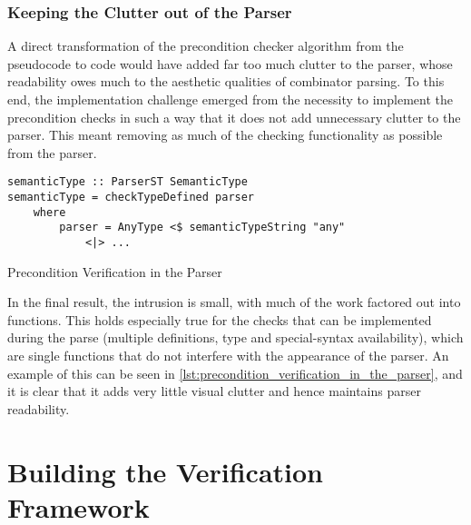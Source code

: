 
\subsubsection{Keeping the Clutter out of the Parser} %
\label{ssub:keeping_the_clutter_out_of_the_parser}
A direct transformation of the precondition checker algorithm from the pseudocode to code would have added far too much clutter to the parser, whose readability owes much to the aesthetic qualities of combinator parsing. 
To this end, the implementation challenge emerged from the necessity to implement the precondition checks in such a way that it does not add unnecessary clutter to the parser.
This meant removing as much of the checking functionality as possible from the parser. 

\begin{listing}[!htb]
\begin{verbatim}
semanticType :: ParserST SemanticType
semanticType = checkTypeDefined parser
    where
        parser = AnyType <$ semanticTypeString "any"
            <|> ...
\end{verbatim}
\caption{Precondition Verification in the Parser}
\label{lst:precondition_verification_in_the_parser}
\end{listing}

In the final result, the intrusion is small, with much of the work factored out into functions. 
This holds especially true for the checks that can be implemented during the parse (multiple definitions, type and special-syntax availability), which are single functions that do not interfere with the appearance of the parser.
An example of this can be seen in \autoref{lst:precondition_verification_in_the_parser}, and it is clear that it adds very little visual clutter and hence maintains parser readability.




\section{Building the Verification Framework} %
\label{sec:building_the_verification_framework}

